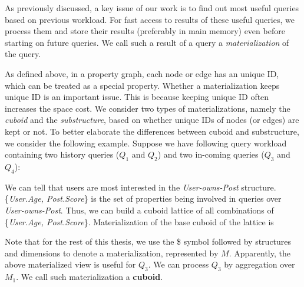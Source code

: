 As previously discussed, a key issue of our work is to find out most useful queries based on previous workload. For fast access to results of these useful queries, we process them and store their results (preferably in main memory) even before starting on future queries. We call such a result of a query a \textit{materialization} of the query. 

As defined above, in a property graph, each node or edge has an unique ID, which can be treated as a special property. Whether a materialization keeps unique ID is an important issue. This is because keeping unique ID often increases the space cost. We consider two types of materializations, namely the \emph{cuboid} and the \emph{substructure}, based on whether unique IDs of nodes (or edges) are kept or not. To better elaborate the differences between cuboid and substructure, we consider the following example. Suppose we have following query workload containing two history queries ($Q_1$ and $Q_2$) and two in-coming queries ($Q_3$ and $Q_4$):







%
%

We can tell that users are most interested in  the \textit{User-owns-Post} structure. \{\emph{User.Age, Post.Score}\} is the set of properties being involved in queries over \textit{User-owns-Post}. Thus, we can build a cuboid lattice of all combinations of  \{\emph{User.Age, Post.Score}\}. Materialization of the base cuboid of the lattice is


\noindent Note that for the rest of this thesis, we use the \$ symbol followed by structures and dimensions to denote a materialization, represented by $M$. Apparently, the above materialized view is useful for $Q_3$. We can process $Q_3$ by aggregation over $M_1$. We call such materialization a \textbf{cuboid}.


